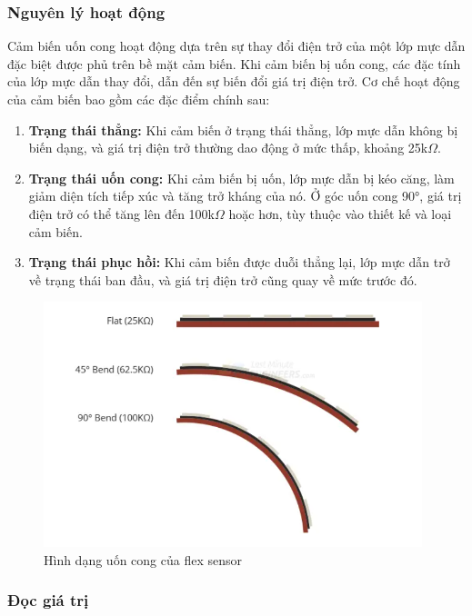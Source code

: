 \subsubsection{Nguyên lý hoạt động}

\indent Cảm biến uốn cong hoạt động dựa trên sự thay đổi điện trở của một lớp mực dẫn đặc biệt được phủ trên bề mặt cảm biến. Khi cảm biến bị uốn cong, các đặc tính của lớp mực dẫn thay đổi, dẫn đến sự biến đổi giá trị điện trở. Cơ chế hoạt động của cảm biến bao gồm các đặc điểm chính sau:

\begin{enumerate}[-]
    \item \textbf{Trạng thái thẳng:} Khi cảm biến ở trạng thái thẳng, lớp mực dẫn không bị biến dạng, và giá trị điện trở thường dao động ở mức thấp, khoảng 25k$\Omega$.
    \item \textbf{Trạng thái uốn cong:} Khi cảm biến bị uốn, lớp mực dẫn bị kéo căng, làm giảm diện tích tiếp xúc và tăng trở kháng của nó. Ở góc uốn cong 90°, giá trị điện trở có thể tăng lên đến 100k$\Omega$ hoặc hơn, tùy thuộc vào thiết kế và loại cảm biến.
    \item \textbf{Trạng thái phục hồi:} Khi cảm biến được duỗi thẳng lại, lớp mực dẫn trở về trạng thái ban đầu, và giá trị điện trở cũng quay về mức trước đó.
\end{enumerate}

\begin{figure}[H]
    \centering
    \includegraphics[width=11cm]{Images/Theoretical basis/flex sensor 1.png}
\caption{Hình dạng uốn cong của flex sensor}
\end{figure}

\subsubsection{Đọc giá trị}

